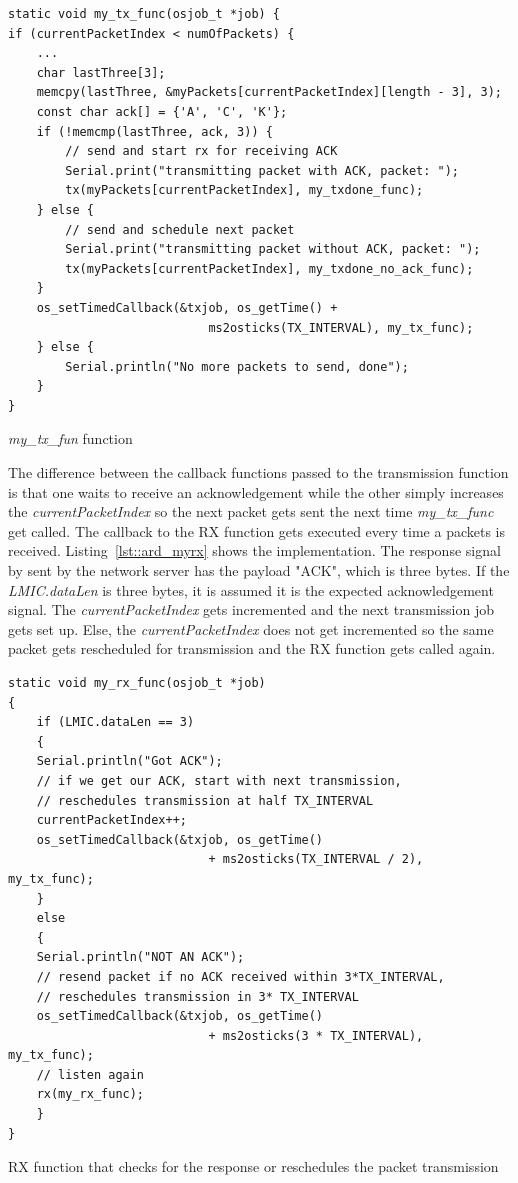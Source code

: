 \begin{listing}[h]
    \begin{verbatim}
static void my_tx_func(osjob_t *job) {
if (currentPacketIndex < numOfPackets) {
    ...
    char lastThree[3];
    memcpy(lastThree, &myPackets[currentPacketIndex][length - 3], 3);
    const char ack[] = {'A', 'C', 'K'};
    if (!memcmp(lastThree, ack, 3)) {
        // send and start rx for receiving ACK
        Serial.print("transmitting packet with ACK, packet: ");
        tx(myPackets[currentPacketIndex], my_txdone_func);
    } else {
        // send and schedule next packet
        Serial.print("transmitting packet without ACK, packet: ");
        tx(myPackets[currentPacketIndex], my_txdone_no_ack_func);
    }
    os_setTimedCallback(&txjob, os_getTime() +
                            ms2osticks(TX_INTERVAL), my_tx_func);
    } else {
        Serial.println("No more packets to send, done");
    }
}
    \end{verbatim}
    \caption{\emph{my\_tx\_fun} function}
    \label{lst::ard_mytx}
\end{listing}

The difference between the callback functions passed to the transmission function is that one
waits to receive an acknowledgement while the other simply increases the \emph{currentPacketIndex}
so the next packet gets sent the next time \emph{my\_tx\_func} get called.
The callback to the RX function gets executed every time a packets is received.
Listing~\ref{lst::ard_myrx} shows the implementation. The response signal by sent
by the network server has the payload "ACK", which is three bytes. 
If the \emph{LMIC.dataLen} is three bytes, it is assumed it is the expected acknowledgement signal.
The \emph{currentPacketIndex} gets incremented and the next transmission job gets set up.
Else, the \emph{currentPacketIndex} does not get incremented so the same packet gets rescheduled 
for transmission and the RX function gets called again.


\begin{listing}[h]
    \begin{verbatim}
static void my_rx_func(osjob_t *job)
{
    if (LMIC.dataLen == 3)
    {
    Serial.println("Got ACK");
    // if we get our ACK, start with next transmission, 
    // reschedules transmission at half TX_INTERVAL
    currentPacketIndex++;
    os_setTimedCallback(&txjob, os_getTime()
                            + ms2osticks(TX_INTERVAL / 2), my_tx_func);
    }
    else
    {
    Serial.println("NOT AN ACK");
    // resend packet if no ACK received within 3*TX_INTERVAL,
    // reschedules transmission in 3* TX_INTERVAL
    os_setTimedCallback(&txjob, os_getTime() 
                            + ms2osticks(3 * TX_INTERVAL), my_tx_func);
    // listen again
    rx(my_rx_func);
    }
}
    \end{verbatim}
    \caption{RX function that checks for the response or reschedules the packet transmission}
    \label{lst::ard_myrx}
\end{listing}


